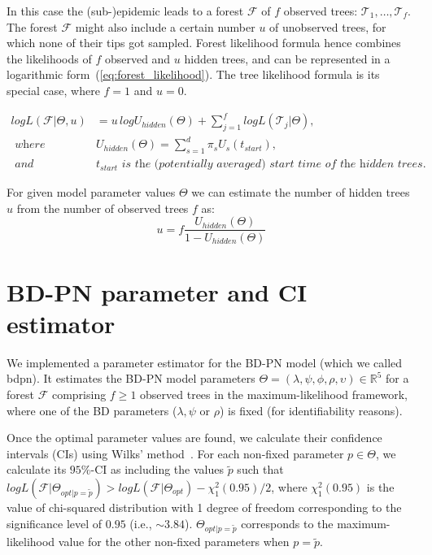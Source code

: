 \documentclass[a4paper,10pt]{article}
\begin{document}
In this case the (sub-)epidemic leads to a forest $\mathscr{F}$ of $f$ observed trees: $\mathscr{T}_1, \ldots, \mathscr{T}_f$. The forest $\mathscr{F}$ might also include a certain number $u$ of unobserved trees, for which none of their tips got sampled.
Forest likelihood formula hence combines the likelihoods of $f$ observed and $u$ hidden trees, and can be represented in a logarithmic form~(\ref{eq:forest_likelihood}). The tree likelihood formula %
is its special case, where $f=1$ and $u=0$. 


\begin{equation}
\begin{split}
logL(\mathscr{F}|\Theta,u)&=u\,logU_{hidden}(\Theta) + \sum\limits_{j=1}^f logL(\mathscr{T}_j|\Theta), \\
\textit{ where }& U_{hidden}(\Theta)=\sum\limits_{s=1}^{d}\pi_s U_s(t_{start}),\\
\textit{ and }& t_{start} \textit{ is the (potentially averaged) start time of the hidden trees.}
\end{split} \label{eq:forest_likelihood} 
\end{equation}

For given model parameter values $\Theta$ we can estimate the number of hidden trees $u$ from the number of observed trees $f$ as:
\begin{equation}
u = f \frac{U_{hidden}(\Theta)}{1 - U_{hidden}(\Theta)}\label{eq:u} 
\end{equation}


\section{BD-PN parameter and CI estimator}\label{sec:sim}
We implemented a parameter estimator for the BD-PN model (which we called bdpn). It estimates the BD-PN model parameters  $\Theta = (\lambda,\psi,\phi,\rho,\upsilon) \in \mathbb{R}^5$ for a forest $\mathscr{F}$ comprising $f \geq 1$ observed trees in the maximum-likelihood framework, where one of the BD parameters ($\lambda,\psi$ or $\rho$) is fixed (for identifiability reasons). 

Once the optimal parameter values are found, we calculate their confidence intervals (CIs) using Wilks' method~\citep{Wilks1938}.
For each non-fixed parameter $p \in \Theta$, we calculate its $95\%$-CI as including the values $\tilde{p}$ such that $log L(\mathscr{F}|\Theta_{opt|p=\tilde{p}}) > log L(\mathscr{F}| \Theta_{opt}) - \chi^2_1(0.95) / 2$, where $\chi^2_1(0.95)$ is the value of chi-squared distribution with 1 degree of freedom corresponding to the significance level of $0.95$ (i.e., $\sim3.84$). $\Theta_{opt|p=\tilde{p}}$ corresponds to the maximum-likelihood value for the other non-fixed parameters when $p = \tilde{p}$. 
\end{document}
